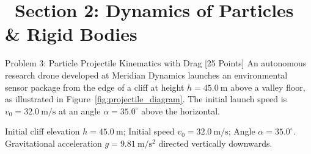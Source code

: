 \documentclass[11pt, a4paper, titlepage=false]{scrartcl}
\begin{document}
\newpage

\section*{\textcolor{PrimaryDark}{\faLayerGroup\ Section 2: Dynamics of Particles \& Rigid Bodies}}

\begin{problembox}{Problem 3: Particle Projectile Kinematics with Drag \hfill [25 Points]}
    An autonomous research drone developed at Meridian Dynamics launches an environmental sensor package from the edge of a cliff at height $h = \SI{45.0}{\meter}$ above a valley floor, as illustrated in Figure~\ref{fig:projectile_diagram}. The initial launch speed is $v_0 = \SI{32.0}{\meter\per\second}$ at an angle $\alpha = 35.0^\circ$ above the horizontal.

    \begin{givenbox}
        Initial cliff elevation $h = \SI{45.0}{\meter}$; Initial speed $v_0 = \SI{32.0}{\meter\per\second}$; Angle $\alpha = 35.0^\circ$.\\
        Gravitational acceleration $g = \SI{9.81}{\meter\per\second\squared}$ directed vertically downwards.
    \end{givenbox}

    \begin{center}
\end{center}
\end{problembox}
\end{document}
